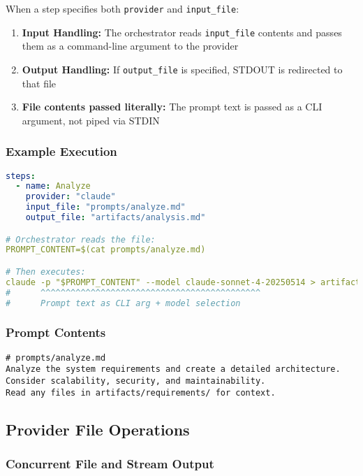 \documentclass[11pt,a4paper]{article}
\begin{document}
When a step specifies both \texttt{provider} and \texttt{input\_file}:

\begin{enumerate}
    \item \textbf{Input Handling:} The orchestrator reads \texttt{input\_file} contents and passes them as a command-line argument to the provider
    \item \textbf{Output Handling:} If \texttt{output\_file} is specified, STDOUT is redirected to that file
    \item \textbf{File contents passed literally:} The prompt text is passed as a CLI argument, not piped via STDIN
\end{enumerate}

\subsubsection{Example Execution}

\begin{lstlisting}[language=yaml, caption={Provider Execution Example}]
steps:
  - name: Analyze
    provider: "claude"
    input_file: "prompts/analyze.md"
    output_file: "artifacts/analysis.md"

# Orchestrator reads the file:
PROMPT_CONTENT=$(cat prompts/analyze.md)

# Then executes:
claude -p "$PROMPT_CONTENT" --model claude-sonnet-4-20250514 > artifacts/analysis.md
#      ^^^^^^^^^^^^^^^^^^^^^^^^^^^^^^^^^^^^^^^^^^^^
#      Prompt text as CLI arg + model selection
\end{lstlisting}

\subsubsection{Prompt Contents}

\begin{lstlisting}[caption={Example Prompt Content}]
# prompts/analyze.md
Analyze the system requirements and create a detailed architecture.
Consider scalability, security, and maintainability.
Read any files in artifacts/requirements/ for context.
\end{lstlisting}


\subsection{Provider File Operations}

\subsubsection{Concurrent File and Stream Output}
\end{document}
